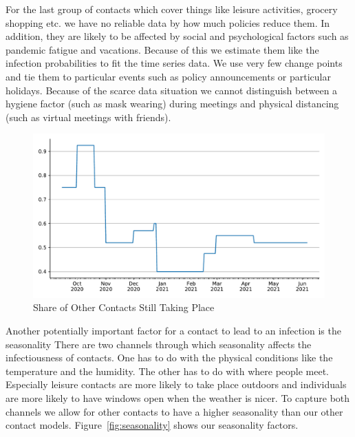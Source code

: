 For the last group of contacts which cover things like leisure activities, grocery
shopping etc. we have no reliable data by how much policies reduce them. In addition,
they are likely to be affected by social and psychological factors such as pandemic
fatigue and vacations. Because of this we estimate them like the infection probabilities
to fit the time series data. We use very few change points and tie them to particular
events such as policy announcements or particular holidays. Because of the scarce data situation we cannot distinguish between a hygiene factor (such as mask wearing) during meetings and physical distancing (such as virtual meetings with friends).

\begin{figure}
    \centering
    \includegraphics[width=\textwidth]{../figures/results/figures/data/other_multiplier}
    \caption{Share of Other Contacts Still Taking Place}
    \label{fig:other_multiplier}
    \floatfoot{\noindent}
\end{figure}

Another potentially important factor for a contact to lead to an infection is the
seasonality \citep{Kuehn2020, Carlson2020} There are two channels through which
seasonality affects the infectiousness of contacts. One has to do with the physical
conditions like the temperature and the humidity. The other has to do with where people
meet. Especially leisure contacts are more likely to take place outdoors and individuals
are more likely to have windows open when the weather is nicer. To capture both channels
we allow for other contacts to have a higher seasonality than our other contact models.
Figure~\ref{fig:seasonality} shows our seasonality factors.


